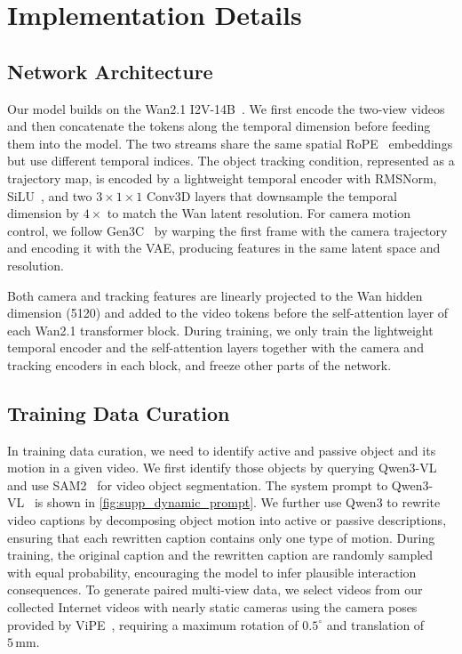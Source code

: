 
\section{Implementation Details}
\label{sec:supp_implement}

\subsection{Network Architecture}
Our model builds on the Wan2.1 I2V-14B~\cite{wan2025wan}. We first encode the two-view videos and then concatenate the tokens along the temporal dimension before feeding them into the model. The two streams share the same spatial RoPE~\cite{su2024roformer} embeddings but use different temporal indices. The object tracking condition, represented as a trajectory map, is encoded by a lightweight temporal encoder with RMSNorm, SiLU~\cite{elfwing2018sigmoid}, and two \(3\times1\times1\) Conv3D layers that downsample the temporal dimension by \(4\times\) to match the Wan latent resolution. For camera motion control, we follow Gen3C~\cite{ren2025gen3c} by warping the first frame with the camera trajectory and encoding it with the VAE, producing features in the same latent space and resolution.

Both camera and tracking features are linearly projected to the Wan hidden dimension (5120) and added to the video tokens before the self-attention layer of each Wan2.1 transformer block. During training, we only train the lightweight temporal encoder and the self-attention layers together with the camera and tracking encoders in each block, and freeze other parts of the network.


\subsection{Training Data Curation}
In training data curation, we need to identify active and passive object and its motion in a given video. We first identify those objects by querying Qwen3-VL~\cite{Qwen3-VL} and use SAM2~\cite{ravi2024sam2} for video object segmentation. The system prompt to Qwen3-VL~\cite{Qwen3-VL} is shown in \cref{fig:supp_dynamic_prompt}. We further use Qwen3 to rewrite video captions by decomposing object motion into active or passive descriptions, ensuring that each rewritten caption contains only one type of motion. During training, the original caption and the rewritten caption are randomly sampled with equal probability, encouraging the model to infer plausible interaction consequences. To generate paired multi-view data, we select videos from our collected Internet videos with nearly static cameras using the camera poses provided by ViPE~\cite{huang2025vipe}, requiring a maximum rotation of $0.5^\circ$ and translation of $5\,\text{mm}$.

